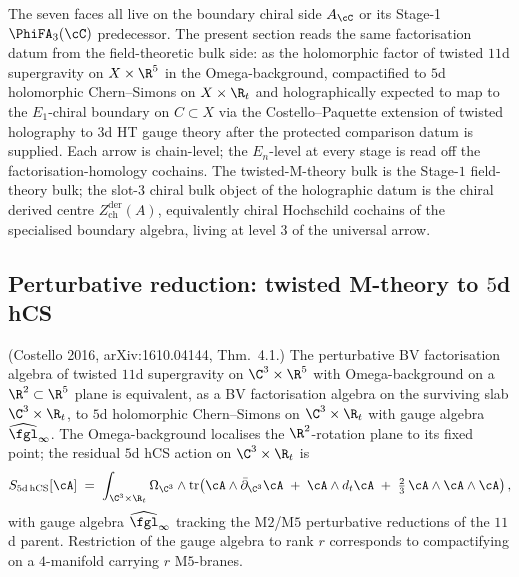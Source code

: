 The seven faces all live on the boundary chiral side $A_\cC$ or its
Stage-1 $\PhiFA_3(\cC)$ predecessor. The present section reads the
same factorisation datum from the field-theoretic bulk side: as the
holomorphic factor of twisted $11$d supergravity on $X \times \R^5$ in the Omega-background,
compactified to $5$d holomorphic Chern--Simons on $X \times \R_t$ and
holographically expected to map to the $E_1$-chiral boundary on
$C \subset X$ via the Costello--Paquette extension of twisted holography
to $3$d HT gauge theory after the protected comparison datum is supplied.
Each arrow is chain-level; the $E_n$-level at every stage is read off
the factorisation-homology cochains. The twisted-M-theory bulk is the
Stage-$1$ field-theory bulk; the slot-$3$ chiral bulk object of the
holographic datum is the chiral derived centre $Z^{\mathrm{der}}_{\mathrm{ch}}(A)$,
equivalently chiral Hochschild cochains of the specialised boundary
algebra, living at level $3$ of the universal arrow.

\subsection{Perturbative reduction: twisted M-theory to \texorpdfstring{$5$}{5}d hCS}
\label{subsec:twisted-m-theory-reduction}

\begin{proposition}
\label{prop:tw-m-theory-to-5d-hcs}
\textup{(Costello 2016, arXiv:1610.04144, Thm.~4.1.)}
The perturbative BV factorisation algebra of twisted $11$d supergravity
on $\C^3 \times \R^5$ with Omega-background on a $\R^2 \subset \R^5$
plane is equivalent, as a BV factorisation algebra on the surviving
slab $\C^3 \times \R_t$, to $5$d holomorphic Chern--Simons on
$\C^3 \times \R_t$ with gauge algebra $\widehat{\fgl}_\infty$. The
Omega-background localises the $\R^2$-rotation plane to its fixed
point; the residual $5$d hCS action on $\C^3 \times \R_t$ is
\[
 S_{5\mathrm{d\,hCS}}[\cA]
 \;=\;
 \int_{\C^3 \times \R_t} \Omega_{\C^3}
 \wedge \operatorname{tr}\!\left(
 \cA \wedge \bar{\partial}_{\C^3} \cA
 \;+\; \cA \wedge d_t \cA
 \;+\; \tfrac{2}{3}\, \cA \wedge \cA \wedge \cA
 \right),
\]
with gauge algebra $\widehat{\fgl}_\infty$ tracking the M$2$/M$5$
perturbative reductions of the $11$d parent. Restriction of the gauge
algebra to rank $r$ corresponds to compactifying on a $4$-manifold
carrying $r$ M$5$-branes.
\end{proposition}

